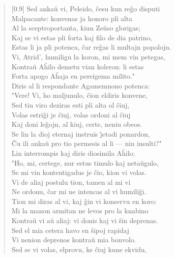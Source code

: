 \begin{verse}[0.9\textwidth]
          Sed anka\u u vi, Peleido, \^cesu kun re\^go disputi\\
          Malpacante: konvenas ja honoro pli alta\\
          Al la sceptroportanta, kiun Ze\u uso glorigas;\\
          Kaj se vi estas pli forta kaj filo de dia patrino,\\
          Estas li ja pli potenca, \^car re\^gas li multajn popolojn.\\
          Vi, Atrid', humiligu la koron, mi mem vin petegas,\\
          Kontra\u u A\^hilo demetu vian koleron: li estas\\
          Forta apogo A\^haja en pereigema milito."\\
           \vin  Diris al li respondante Agamemnono potenca:\\
          "Vere! Vi, ho maljunulo, \^cion eldiris konvene,\\
          Sed tiu viro deziras esti pli alta ol \^ciuj,\\
          Volas estri\^gi je \^ciuj, volas ordoni al \^ciuj\\
          Kaj doni le\^gojn, al kiuj, certe, neniu obeos.\\
          Se lin la dioj eternaj instruis \^{\j}etadi ponardon,\\
          \^Cu ili anka\u u pro tio permesis al li --- nin insulti?"\\
           \vin  Lin interrompis kaj diris diosimila A\^hilo;\\
          "Ho, mi, certege, nur estus timulo kaj neta\u ugulo,\\
          Se mi vin kontentigadus je \^cio, kion vi volas.\\
          Vi de aliaj postulu tion, tamen al mi vi\\
          Ne ordonu, \^car mi ne intencas al vi humili\^gi.\\
          Tion mi diras al vi, kaj \^gin vi konservu en koro:\\
          Mi la manon armitan ne levos pro la knabino\\
          Kontra\u u vi a\u u aliaj: vi donis kaj vi \^sin deprenas.\\
          Sed el mia cetera havo en \^sipoj rapidaj\\
          Vi nenion deprenos kontra\u u mia bonvolo.\\
          Sed se vi volas, elprovu, ke \^ciuj kune ekvidu,\\

\end{verse}
